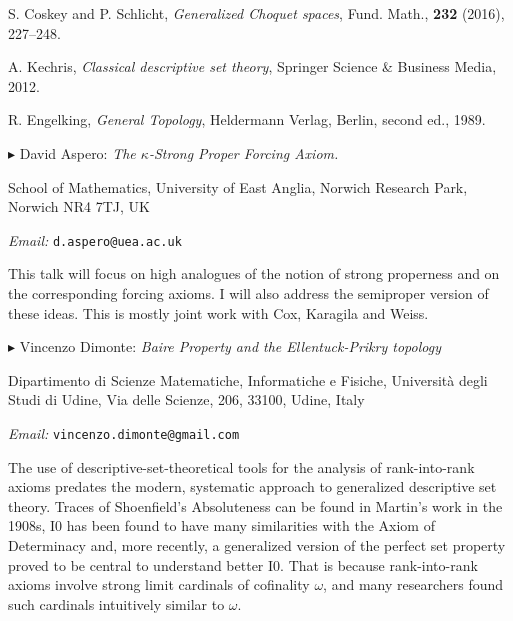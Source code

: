 \documentclass[a4paper]{amsart}
\theoremstyle{remark}
\newcommand{\vsp}{\vspace{20pt}}
\begin{document}
\begin{thebibliography}{100}

 S. Coskey and P. Schlicht, \emph{Generalized Choquet spaces}, Fund. Math., \textbf{232} (2016), 227--248.

 A. Kechris, \emph{Classical descriptive set theory}, Springer Science \& Business Media, 2012.
 
 R. Engelking, \emph{General Topology}, Heldermann Verlag, Berlin, second ed., 1989.
 
\end{thebibliography}









\vsp

\noindent 
$\blacktriangleright$ David Aspero: \emph{The $\kappa$-Strong Proper Forcing Axiom.} 

\noindent 
School of Mathematics, 
University of East Anglia, 
Norwich Research Park, 
Norwich NR4 7TJ, 
UK 

\noindent 
\emph{Email:} \texttt{d.aspero@uea.ac.uk}

This talk will focus on high analogues of the notion of strong properness and on the corresponding forcing axioms. I will also address the semiproper version of these ideas. This is mostly joint work with Cox, Karagila and Weiss.





\vsp 

\noindent 
$\blacktriangleright$ Vincenzo Dimonte: \emph{Baire Property and the Ellentuck-Prikry topology} 

\noindent 
Dipartimento di Scienze Matematiche, Informatiche e Fisiche, 
Universit\`a degli Studi di Udine, 
Via delle Scienze, 206, 
33100, Udine, Italy 

\noindent 
\emph{Email:} \texttt{vincenzo.dimonte@gmail.com}

The use of descriptive-set-theoretical tools for the analysis of rank-into-rank axioms predates the modern, systematic approach to generalized descriptive set theory. Traces of Shoenfield's Absoluteness can be found in Martin's work in the 1908s, I0 has been found to have many similarities with the Axiom of Determinacy and, more recently, a generalized version of the perfect set property proved to be central to understand better I0. That is because rank-into-rank axioms involve strong limit cardinals of cofinality $\omega$, and many researchers found such cardinals intuitively similar to $\omega$.
\end{document}
